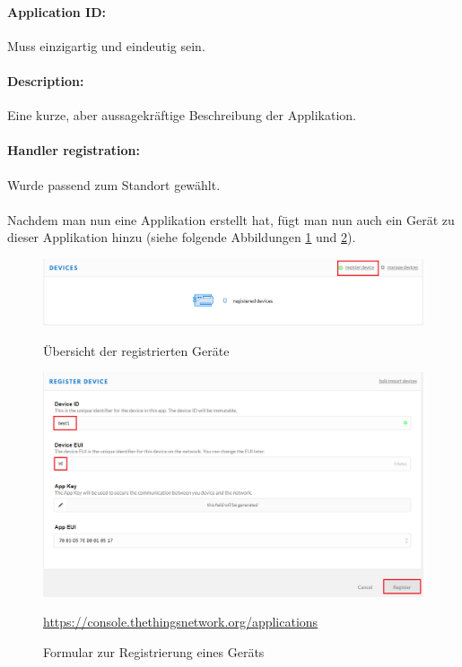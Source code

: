 \paragraph{Application ID:} Muss einzigartig und eindeutig sein.
\paragraph{Description:} Eine kurze, aber aussagekräftige Beschreibung der Applikation.
\paragraph{Handler registration:} Wurde passend zum Standort gewählt.\\
\\
Nachdem man nun eine Applikation erstellt hat, fügt man nun auch ein Gerät zu dieser Applikation hinzu (siehe folgende Abbildungen \ref{fig:lora-4} und \ref{fig:lora-5}).
\begin{figure}[H]
    \center
    \includegraphics[width=16cm]{Bilder/lora-4.png}\\
    \caption{Übersicht der registrierten Geräte}
    \label{fig:lora-4}
\end{figure}
\begin{figure}[H]
    \center
    \includegraphics[width=16cm]{Bilder/lora-5.png}\\
    \caption{Formular zur Registrierung eines Geräts}
    \begin{center} \quelle\url{https://console.thethingsnetwork.org/applications} \end{center}
    \label{fig:lora-5}
\end{figure}
\newpage
